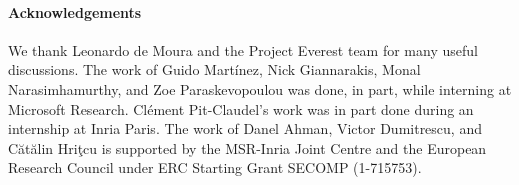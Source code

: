 \documentclass[runningheads]{llncs}
\begin{document}
\newcommand\grantsponsor[3]{#2}
\newcommand\grantnum[2]{#1-#2}

\ifcamera
\paragraph{Acknowledgements}
  We thank Leonardo de Moura
  and the Project Everest team for many useful discussions.
  The work of
    Guido Mart\'inez,
    Nick Giannarakis,
    Monal Narasimhamurthy,
  and Zoe Paraskevopoulou
  was done, in part, while interning at Microsoft Research.
  Cl\'ement Pit-Claudel's work was in part done
  during an internship at Inria Paris.
  The work of Danel Ahman, Victor Dumitrescu, and C\u{a}t\u{a}lin Hri\c{t}cu
  is supported by the MSR-Inria Joint Centre and the
  \grantsponsor{1}{European Research Council}{https://erc.europa.eu/}
  under ERC Starting Grant SECOMP (\grantnum{1}{715753}).
\fi

%


\iffull
\newpage
\appendix

\fi



\end{document}
